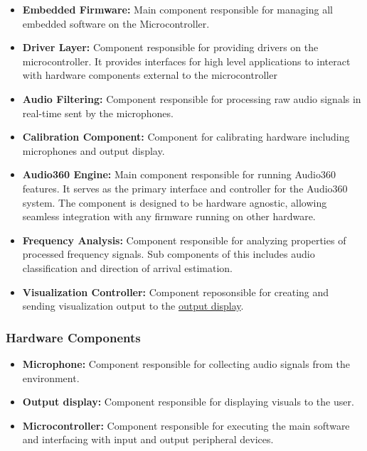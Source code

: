 \documentclass[12pt]{article}
\theoremstyle{definition}
\begin{document}
\begin{itemize}
  \item \textbf{Embedded Firmware:} \label{comp:embedded_firmware}
  Main component responsible for managing all embedded software on the
  Microcontroller.

  \item \textbf{Driver Layer:} \label{comp:driver_layer}
  Component responsible for providing drivers on the microcontroller. It
  provides interfaces for high level applications to interact with
  hardware components external to the microcontroller

  \item \textbf{Audio Filtering:} \label{comp:audio_filtering}
  Component responsible for processing raw audio signals in real-time sent
  by the microphones.

  \item \textbf{Calibration Component:} \label{comp:calibration}
  Component for calibrating hardware including microphones and output display.
  
  \item \textbf{Audio360 Engine:} \label{comp:audio360Engine}
  Main component responsible for running Audio360 features. It serves as the
  primary interface and controller for the Audio360 system. The component is
  designed to be hardware agnostic, allowing seamless integration with any
  firmware running on other hardware.
  
  \item \textbf{Frequency Analysis:} \label{comp:frequency_analysis}
  Component responsible for analyzing properties of processed frequency signals.
  Sub components of this includes audio classification and direction of arrival
  estimation.
  
  \item \textbf{Visualization Controller:} \label{comp:viz_controller}
  Component reposonsible for creating and sending visualization output to the
  \hyperref[comp:display]{output display}.
\end{itemize}

\subsubsection{Hardware Components}

\begin{itemize}
  \item \textbf{Microphone:}\label{comp:microphone}
  Component responsible for collecting audio signals from the environment.

  \item \textbf{Output display:}\label{comp:display} Component responsible for
  displaying visuals to the user.

  \item \textbf{Microcontroller:}
  \label{comp:microcontroller} Component responsible for executing the main
  software and interfacing with input and output peripheral devices.
\end{itemize}
\end{document}
